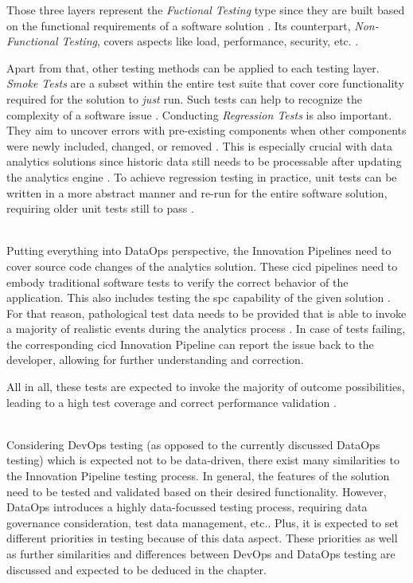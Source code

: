 Those three layers represent the \textit{Fuctional Testing} type since they are built based on the functional requirements of a software solution \cite[69]{Mahfuz2016}. Its counterpart, \textit{Non-Functional Testing}, covers aspects like load, performance, security, etc. \cite[70]{Mahfuz2016}.

Apart from that, other testing methods can be applied to each testing layer. \textit{Smoke Tests} are a subset within the entire test suite that cover core functionality required for the solution to \textit{just} run. Such tests can help to recognize the complexity of a software issue \cite[sec. 5]{Tarlinder2016}. Conducting \textit{Regression Tests} is also important. They aim to uncover errors with pre-existing components when other components were newly included, changed, or removed \cite[70]{Mahfuz2016}\cite{Mathur2013}. This is especially crucial with data analytics solutions since historic data still needs to be processable after updating the analytics engine \cite{Shen2019}. To achieve regression testing in practice, unit tests can be written in a more abstract manner and re-run for the entire software solution, requiring older unit tests still to pass \cite{Mathur2013}.
\\\

Putting everything into DataOps perspective, the Innovation Pipelines need to cover source code changes of the analytics solution. These \ac{cicd} pipelines need to embody traditional software tests to verify the correct behavior of the application. This also includes testing the \ac{spc} capability of the given solution \cite{DataKitchen2020}. For that reason, pathological test data needs to be provided that is able to invoke a majority of realistic events during the analytics process \cite[42]{Bergh2019}. In case of tests failing, the corresponding \ac{cicd} Innovation Pipeline can report the issue back to the developer, allowing for further understanding and correction.

All in all, these tests are expected to invoke the majority of outcome possibilities, leading to a high test coverage and correct performance validation \cite{DataKitchen2020a}. \\\

Considering DevOps testing (as opposed to the currently discussed DataOps testing) which is expected not to be data-driven, there exist many similarities to the Innovation Pipeline testing process. In general, the features of the solution need to be tested and validated based on their desired functionality. However, DataOps introduces a highly data-focussed testing process, requiring data governance consideration, test data management, etc.. Plus, it is expected to set different priorities in testing because of this data aspect. These priorities as well as further similarities and differences between DevOps and DataOps testing are discussed and expected to be deduced in the  chapter.
